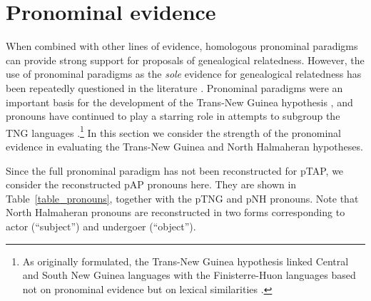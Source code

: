\section{Pronominal evidence} \label{sec:4:3}
When combined with other lines of evidence, homologous pronominal paradigms can provide strong support for proposals of genealogical relatedness. However, the use of pronominal paradigms as the \textit{sole }evidence for genealogical relatedness has been repeatedly questioned in the literature \citep[cf.][]{CampbellEtAl2008}. Pronominal paradigms were an important basis for the development of the Trans-New Guinea hypothesis \citep{WurmEtAl1975}, and pronouns have continued to play a starring role in attempts to subgroup the TNG languages \citep{Ross2005,Ross2006}.\footnote{As originally formulated, the Trans-New Guinea hypothesis linked Central and South New Guinea languages with the Finisterre-Huon languages based not on pronominal evidence but on lexical similarities \citep{McElhanonEtAl1970}.} In this section we consider the strength of the pronominal evidence in evaluating the Trans-New Guinea and North Halmaheran hypotheses.
 

Since the full pronominal paradigm has not been reconstructed for pTAP, we consider the reconstructed pAP pronouns here. They are shown in Table~\ref{table_pronouns}, together with the pTNG \citep{Ross2005} and pNH \citep{Wada1980} pronouns. Note that North Halmaheran pronouns are reconstructed in two forms corresponding to actor (``subject'') and undergoer (``object'').




